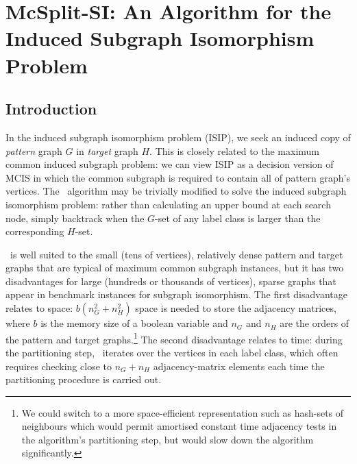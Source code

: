 
\newcommand{\varStartG}{\ensuremath{\AlgVar{start}_G}}
\newcommand{\varEndG}{\ensuremath{\AlgVar{end}_G}}
\newcommand{\varStartH}{\ensuremath{\AlgVar{start}_H}}
\newcommand{\varEndH}{\ensuremath{\AlgVar{end}_H}}
\newcommand{\varActive}{\ensuremath{\AlgVar{active}}}
\newcommand{\varSplitting}{\ensuremath{\AlgVar{splitting}}}
\newcommand{\varPrev}{\ensuremath{\AlgVar{prev}}}
\newcommand{\varNext}{\ensuremath{\AlgVar{next}}}
\newcommand{\labelClass}{\ensuremath{\AlgVar{labelClass}}}
\newcommand{\vertexPtr}{\ensuremath{\AlgVar{vertexPtr}}}
\newcommand{\calLC}{\ensuremath{\mathcal{LC}}}
\newcommand{\LC}{\ensuremath{\AlgVar{LC}}}
\newcommand{\Gptrs}{\ensuremath{P_G}}
\newcommand{\Hptrs}{\ensuremath{P_H}}
\newcommand{\Garray}{\ensuremath{A_G}}
\newcommand{\Harray}{\ensuremath{A_H}}

\chapter{McSplit-SI: An Algorithm for the Induced Subgraph Isomorphism Problem}
\label{c:mcsplit-si}

\section{Introduction}

In the induced subgraph isomorphism problem (ISIP), we seek an induced copy of \emph{pattern} graph $G$ in \emph{target} graph $H$. This is closely related to the maximum common induced subgraph problem: we can view ISIP as a decision version of MCIS in which the common subgraph is required to contain all of pattern graph's vertices.
The \McSplit\ algorithm may be trivially modified to solve the induced subgraph isomorphism problem: rather than calculating an upper bound at each search node, simply backtrack when the $G$-set of any label class is larger than the corresponding $H$-set.

\McSplit\ is well suited to the small (tens of vertices), relatively dense pattern and target graphs that are typical of maximum common subgraph instances, but it has two disadvantages for large (hundreds or thousands of vertices), sparse graphs that appear in benchmark instances for subgraph isomorphism.  The first disadvantage relates to space: $b(n_G^2 + n_H^2)$ space is needed to store the adjacency matrices, where $b$ is the memory size of a boolean variable and $n_G$ and $n_H$ are the orders of the pattern and target graphs.\footnote{We could switch to a more space-efficient representation such as hash-sets of neighbours which would permit amortised constant time adjacency tests in the algorithm's partitioning step, but would slow down the algorithm significantly.}  The second disadvantage relates to time: during the partitioning step, \McSplit\ iterates over the vertices in each label class, which often requires checking close to $n_G + n_H$ adjacency-matrix elements each time the partitioning procedure is carried out.

